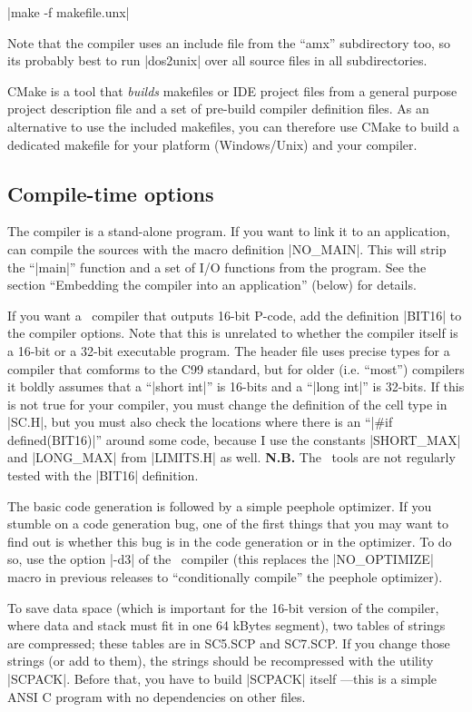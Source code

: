 \tabto 40pt |make -f makefile.unx|

Note that the compiler uses an include file from the ``amx'' subdirectory too,
so its probably best to run |dos2unix| over all source files in all
subdirectories.

CMake is a tool that {\it builds\/} makefiles or IDE project files from a general
purpose project description file and a set of pre-build compiler definition files.
As an alternative to use the included makefiles, you can therefore use CMake to
build a dedicated makefile for your platform (Windows\slash Unix) and your
compiler.

\subsection{Compile-time options}
The compiler is a stand-alone program. If you want to link it to an
application, can compile the sources with the macro definition |NO_MAIN|. This
will strip the ``|main|'' function and a set of I/O functions from the program.
See the section ``Embedding the compiler into an application'' (below) for details.

If you want a \Small\ compiler that outputs 16-bit P-code, add the definition
|BIT16| to the compiler options. Note that this is unrelated to whether the
compiler itself is a 16-bit or a 32-bit executable program. The header file
uses precise types for a compiler that comforms to the C99 standard, but for
older (i.e. ``most'') compilers it boldly assumes that a ``|short int|'' is
16-bits and a ``|long int|'' is 32-bits. If
this is not true for your compiler, you must change the definition of the cell
type in |SC.H|, but you must also check the locations where there is an
``|#if defined(BIT16)|'' around some code, because I use the constants
|SHORT_MAX| and |LONG_MAX| from |LIMITS.H| as well. \lbreak
{\bf N.B.} The \Small\ tools are not regularly tested with the |BIT16| definition.

 
The basic code generation is followed by a simple peephole optimizer. If you
stumble on a code generation bug, one of the first things that you may want
to find out is whether this bug is in the code generation or in the optimizer.
To do so, use the option |-d3| of the \Small\ compiler (this replaces the
|NO_OPTIMIZE| macro in previous releases to ``conditionally compile'' the peephole
optimizer).

To save data space (which is important for the 16-bit version of the compiler,
where data and stack must fit in one 64 kBytes segment), two tables of strings
are compressed; these tables are in SC5.SCP and SC7.SCP. If you change those
strings (or add to them), the strings should be recompressed with the utility
|SCPACK|. Before that, you have to build |SCPACK| itself ---this is a simple
ANSI C program with no dependencies on other files.


